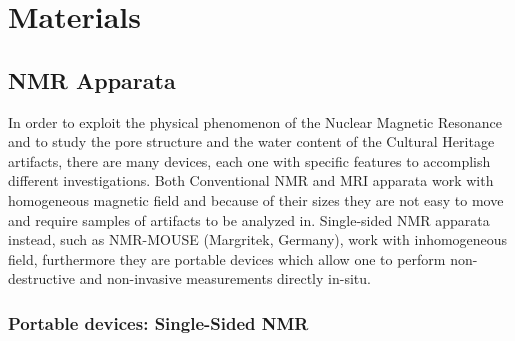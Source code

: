 \documentclass[a4paper,11pt]{report}
\begin{document}
\clearpage

\chapter{Materials}

\section{NMR Apparata}
In order to exploit the physical phenomenon of the Nuclear Magnetic Resonance and to study  the pore structure and the water content of the Cultural Heritage artifacts, there are many devices, each one with specific features to accomplish different investigations. Both Conventional NMR and MRI apparata work with homogeneous magnetic field and because of their sizes they are not easy to move and require samples of artifacts to be analyzed in. Single-sided NMR apparata instead, such as NMR-MOUSE (Margritek, Germany), work with inhomogeneous field, furthermore they are portable devices which allow one to perform non-destructive and non-invasive measurements directly in-situ.

\subsection{Portable devices: Single-Sided NMR}
\end{document}
